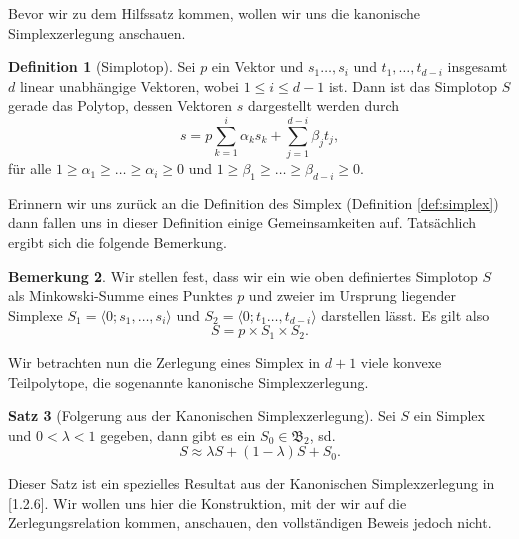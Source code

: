 \documentclass[11pt,titlepage]{article}
\theoremstyle{definition}
\newtheorem{theorem}{Satz}[section]
\newtheorem{definition}[theorem]{Definition}
\newtheorem{remark}[theorem]{Bemerkung}
\theoremstyle{remark}
\begin{document}
	Bevor wir zu dem Hilfssatz kommen, wollen wir uns die kanonische 
	Simplexzerlegung anschauen. 
		
	\begin{definition}[Simplotop]
		Sei $p$ ein Vektor und  $s_1\ldots,s_i$ und 
		$t_1,\ldots,t_{d-i}$ insgesamt 
		$d$ linear unabhängige Vektoren, wobei $1\leq i\leq d-1$ ist. Dann ist 
		das Simplotop $S$ gerade das Polytop, dessen Vektoren $s$ 
		dargestellt werden durch
		\[s=p\sum_{k=1}^i \alpha_k s_k +\sum_{j=1}^{d-i}\beta_j t_j,\]
		für alle $1\geq \alpha_1\geq\ldots\geq\alpha_i\geq 0$ und 
		$1\geq \beta_1\geq\ldots\geq\beta_{d-i}\geq 0$.
	\end{definition}
	
	Erinnern wir uns zurück an die Definition des Simplex (Definition \ref{def:simplex}) dann fallen uns in dieser Definition einige Gemeinsamkeiten 
	auf. Tatsächlich ergibt sich die folgende Bemerkung.
	
	\begin{remark}
		Wir stellen fest, dass wir ein wie oben definiertes Simplotop $S$ 
		als Minkowski-Summe eines Punktes $p$ und zweier 
		im Ursprung liegender Simplexe $S_1=\langle 0;s_1,\ldots,s_i\rangle$ 
		und $S_2=\langle 0;t_1\ldots,t_{d-i}\rangle$ darstellen lässt. 
		Es gilt also 
		\[S=p\times S_1 \times S_2.\]
	\end{remark}
	
	Wir betrachten nun die Zerlegung eines Simplex in $d+1$ viele konvexe 
	Teilpolytope, die sogenannte kanonische Simplexzerlegung. 
	
	\begin{theorem}[Folgerung aus der Kanonischen Simplexzerlegung]\label{thm:kanonsimpl}
		Sei $S$ ein Simplex und $0<\lambda<1$ gegeben, dann 
		gibt es ein $S_0\in\mathfrak{B}_2$, sd.
		\[S\approx \lambda S+(1-\lambda)S +S_0.\]
	\end{theorem}
	
	Dieser Satz ist ein spezielles Resultat aus der Kanonischen Simplexzerlegung 
	in \cite{Hadwiger}[1.2.6]. Wir wollen uns hier die Konstruktion, mit 
	der wir auf die Zerlegungsrelation kommen, anschauen, den vollständigen 
	Beweis jedoch nicht.
	
\end{document}
